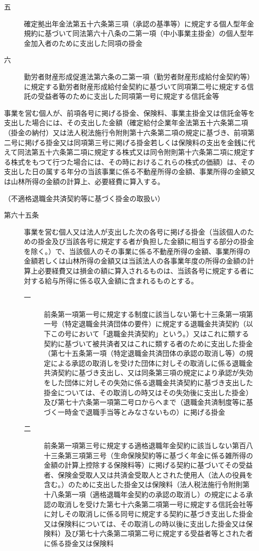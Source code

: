 \documentclass[twocolumn,a4j,10pt]{ltjtarticle}
\begin{document}
\begin{description}
\begin{description}
\item[五]確定拠出年金法第五十六条第三項（承認の基準等）に規定する個人型年金規約に基づいて同法第六十八条の二第一項（中小事業主掛金）の個人型年金加入者のために支出した同項の掛金
\item[六]勤労者財産形成促進法第六条の二第一項（勤労者財産形成給付金契約等）に規定する勤労者財産形成給付金契約に基づいて同項第二号に規定する信託の受益者等のために支出した同項第一号に規定する信託金等
\end{description}
\item[\rensuji{2}]事業を営む個人が、前項各号に掲げる掛金、保険料、事業主掛金又は信託金等を支出した場合には、その支出した金額（確定給付企業年金法第五十六条第二項（掛金の納付）又は法人税法施行令附則第十六条第二項の規定に基づき、前項第二号に掲げる掛金又は同項第三号に掲げる掛金若しくは保険料の支出を金銭に代えて同法第五十六条第二項に規定する株式又は同令附則第十六条第二項に規定する株式をもつて行つた場合には、その時におけるこれらの株式の価額）は、その支出した日の属する年分の当該事業に係る不動産所得の金額、事業所得の金額又は山林所得の金額の計算上、必要経費に算入する。
\end{description}
\noindent\hspace{10pt}（不適格退職金共済契約等に基づく掛金の取扱い）
\begin{description}
\item[第六十五条]事業を営む個人又は法人が支出した次の各号に掲げる掛金（当該個人のための掛金及び当該各号に規定する者が負担した金額に相当する部分の掛金を除く。）で、当該個人のその事業に係る不動産所得の金額、事業所得の金額若しくは山林所得の金額又は当該法人の各事業年度の所得の金額の計算上必要経費又は損金の額に算入されるものは、当該各号に規定する者に対する給与所得に係る収入金額に含まれるものとする。
\begin{description}
\item[一]前条第一項第一号に規定する制度に該当しない第七十三条第一項第一号（特定退職金共済団体の要件）に規定する退職金共済契約（以下この号において「退職金共済契約」という。）又はこれに類する契約に基づいて被共済者又はこれに類する者のために支出した掛金（第七十五条第一項（特定退職金共済団体の承認の取消し等）の規定による承認の取消しを受けた団体に対しその取消しに係る退職金共済契約に基づき支出し、又は同条第三項の規定により承認が失効をした団体に対しその失効に係る退職金共済契約に基づき支出した掛金については、その取消しの時又はその失効後に支出した掛金）及び第七十六条第一項第二号ロからヘまで（退職金共済制度等に基づく一時金で退職手当等とみなさないもの）に掲げる掛金
\item[二]前条第一項第三号に規定する適格退職年金契約に該当しない第百八十三条第三項第三号（生命保険契約等に基づく年金に係る雑所得の金額の計算上控除する保険料等）に掲げる契約に基づいてその受益者、保険金受取人又は共済金受取人とされた使用人（法人の役員を含む。）のために支出した掛金又は保険料（法人税法施行令附則第十八条第一項（適格退職年金契約の承認の取消し）の規定による承認の取消しを受けた第七十六条第二項第一号に規定する信託会社等に対しその取消しに係る同号に規定する契約に基づき支出した掛金又は保険料については、その取消しの時以後に支出した掛金又は保険料）及び第七十六条第二項第二号に規定する受益者等とされた者に係る掛金又は保険料
\end{description}
\end{description}
\end{document}
